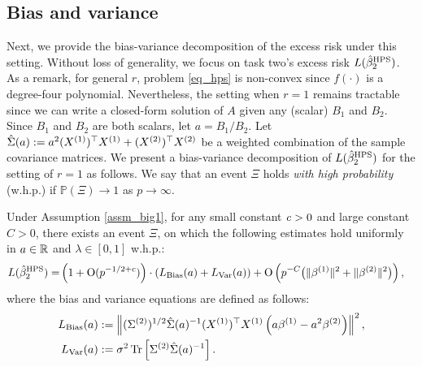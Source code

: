 
\subsection{Bias and variance}\label{sec_bv}


Next, we provide the bias-variance decomposition of the excess risk under this setting.
Without loss of generality, we focus on task two's excess risk $L(\hat{\beta}^{\textup{HPS}}_2)$.
As a remark, for general $r$, problem \eqref{eq_hps} is non-convex since $f(\cdot)$ is a degree-four polynomial.
Nevertheless, the setting when $r = 1$ remains tractable since we can write a closed-form solution of $A$ given any (scalar) $B_1$ and $B_2$.
Since $B_1$ and $B_2$ are both scalars, let $a = B_1 / B_2$.
Let $\hat{\Sigma}(a) := a^2 (X^{(1)})^{\top} X^{(1)} + (X^{(2)})^{\top} X^{(2)}$ be a weighted combination of the sample covariance matrices.
We present a bias-variance decomposition of $L(\hat{\beta}^{\textup{HPS}}_2)$ for the setting of $r = 1$ as follows.
We say that an event $\Xi$ holds \emph{with high probability} (w.h.p.) if $\mathbb P(\Xi)\to 1$ as $p\to \infty$.

\begin{proposition}\label{lem_HPS_loss}
     Under Assumption \ref{assm_big1}, for any small constant ${\mathit{c}}>0$ and large constant $C>0$, there exists an event $\Xi$, on which the following estimates hold uniformly in $a\in \mathbb{R}$ and $\lambda\in [0,1]$ w.h.p.:
    \begin{align}
        L(\hat{\beta}_2^{\MTL}) =& \left( 1+ \OO(p^{-1/2+c})\right)\cdot \left(L_{\bias} (a) + L_{\var}(a)\right) %
        + \OO \left( p^{-C}\big( \|\beta^{(1)} \|^2  +  \|\beta^{(2)} \|^2\big)   \right), \label{L_HPS_simple}
    \end{align}
    where the bias and variance equations are defined as follows:
    \begin{align}
        L_{\textup{Bias}} (a) &:= \left\| (\Sigma^{(2)})^{1/2}\hat \Sigma(a)^{-1} (X^{(1)})^\top X^{(1)} \left(a\beta^{(1)}- a^2\beta^{(2)}\right) \right\|^2,  \label{Lbias} \\
        L_{\operatorname{Var}}(a)   &:= \sigma^2  \operatorname{Tr}\left[{\Sigma^{(2)}\hat \Sigma(a)^{-1}  }\right].  \label{Lvar}
    \end{align}
\end{proposition}



